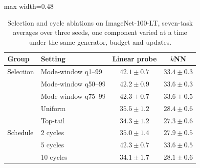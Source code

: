 \begin{table}
\vspace{-10pt}
\centering
\footnotesize
\setlength{\tabcolsep}{4pt}
\caption{Selection and cycle ablations on ImageNet-100-LT, seven-task averages over three seeds, one component varied at a time under the same generator, budget and updates.}
\label{tab:main_mechanism}
\begin{adjustbox}{max width=0.48\textwidth}
\begin{tabular}{llcc}
\toprule
Group & Setting & Linear probe & $k$NN \\
\midrule
Selection & Mode-window q1--99 & $42.1\pm0.7$ & $33.4\pm0.3$ \\
 & Mode-window q50--99 & $42.2\pm0.9$ & $33.6\pm0.3$ \\
 & Mode-window q75--99 & $42.3\pm0.7$ & $33.6\pm0.5$ \\
 & Uniform & $35.5\pm1.2$ & $28.4\pm0.6$ \\
 & Top-tail & $34.3\pm1.2$ & $27.3\pm0.6$ \\
\midrule
Schedule & 2 cycles & $35.0\pm1.4$ & $27.9\pm0.5$ \\
 & 5 cycles & $42.3\pm0.7$ & $33.6\pm0.5$ \\
 & 10 cycles & $34.1\pm1.7$ & $28.1\pm0.6$ \\
\bottomrule
\end{tabular}
\end{adjustbox}
\vspace{-8pt}
\end{table}
